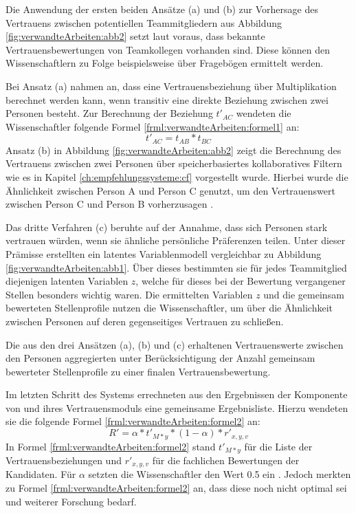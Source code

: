 Die Anwendung der ersten beiden Ansätze (a) und (b) zur Vorhersage des Vertrauens zwischen potentiellen Teammitgliedern aus Abbildung \ref{fig:verwandteArbeiten:abb2} setzt laut \textcite{malinowski:2005} voraus, dass bekannte Vertrauensbewertungen von Teamkollegen vorhanden sind. Diese können den Wissenschaftlern zu Folge beispielsweise über Fragebögen ermittelt werden.

Bei Ansatz (a) nahmen \textcite[S. 5f.]{malinowski:2005} an, dass eine Vertrauensbeziehung über Multiplikation berechnet werden kann, wenn transitiv eine direkte Beziehung zwischen zwei Personen besteht. Zur Berechnung der Beziehung $t'_{AC}$ wendeten die Wissenschaftler folgende Formel \ref{frml:verwandteArbeiten:formel1} an:
\begin{equation}
	t'_{AC} = t_{AB} * t_{BC}
	\label{frml:verwandteArbeiten:formel1}
\end{equation}
Ansatz (b) in Abbildung \ref{fig:verwandteArbeiten:abb2} zeigt die Berechnung des Vertrauens zwischen zwei Personen über speicherbasiertes kollaboratives Filtern wie es in Kapitel \ref{ch:empfehlungssysteme:cf} vorgestellt wurde. Hierbei wurde die Ähnlichkeit zwischen Person A und Person C genutzt, um den Vertrauenswert zwischen Person C und Person B vorherzusagen \cite[S. 6]{malinowski:2005}.

Das dritte Verfahren (c) beruhte auf der Annahme, dass sich Personen stark vertrauen würden, wenn sie ähnliche persönliche Präferenzen teilen. Unter dieser Prämisse erstellten \textcite[S. 6f.]{malinowski:2005} ein latentes Variablenmodell vergleichbar zu Abbildung \ref{fig:verwandteArbeiten:abb1}. Über dieses bestimmten sie für jedes Teammitglied diejenigen latenten Variablen $z$, welche für dieses bei der Bewertung vergangener Stellen besonders wichtig waren. Die ermittelten Variablen $z$ und die gemeinsam bewerteten Stellenprofile nutzen die Wissenschaftler, um über die Ähnlichkeit zwischen Personen auf deren gegenseitiges Vertrauen zu schließen.

Die aus den drei Ansätzen (a), (b) und (c) erhaltenen Vertrauenswerte zwischen den Personen aggregierten \textcite[S. 7ff.]{malinowski:2005} unter Berücksichtigung der Anzahl gemeinsam bewerteter Stellenprofile zu einer finalen Vertrauensbewertung.

Im letzten Schritt des Systems errechneten \textcite[S. 9f.]{malinowski:2005} aus den Ergebnissen der Komponente von \textcite[S. 8ff.]{faerber:2003} und ihres Vertrauensmoduls eine gemeinsame Ergebnisliste. Hierzu wendeten sie die folgende Formel \ref{frml:verwandteArbeiten:formel2} an:
\begin{equation}
	R' = \alpha * t'_{M*y} * (1-\alpha) * r'_{x,y,v}
	\label{frml:verwandteArbeiten:formel2}
\end{equation}
In Formel \ref{frml:verwandteArbeiten:formel2} stand $t'_{M*y}$ für die Liste der Vertrauensbeziehungen und $r'_{x,y,v}$ für die fachlichen Bewertungen der Kandidaten. Für $\alpha$ setzten die Wissenschaftler den Wert 0.5 ein \cite[S. 4ff.]{malinowski:2005}. Jedoch merkten \textcite[S. 9]{malinowski:2005} zu Formel \ref{frml:verwandteArbeiten:formel2} an, dass diese noch nicht optimal sei und weiterer Forschung bedarf.


